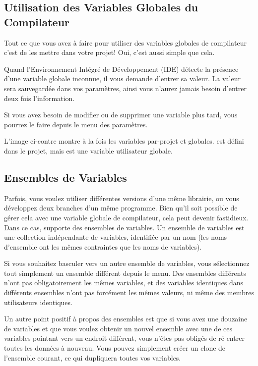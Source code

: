 \subsection{Utilisation des Variables Globales du Compilateur}

Tout ce que vous avez à faire pour utiliser des variables globales de compilateur c'est de les mettre dans votre projet! Oui, c'est aussi simple que cela.

Quand l'Environnement Intégré de Développement (IDE) détecte la présence d'une variable globale inconnue, il vous demande d'entrer sa valeur. La valeur sera sauvegardée dans vos paramètres, ainsi vous n'aurez jamais besoin d'entrer deux fois l'information.

Si vous avez besoin de modifier ou de supprimer une variable plus tard, vous pourrez le faire depuis le menu des paramètres.




L'image ci-contre montre à la fois les variables par-projet et globales.  est défini dans le projet, mais  est une variable utilisateur globale.

\subsection{Ensembles de Variables}

Parfois, vous voulez utiliser différentes versions d'une même librairie, ou vous développez deux branches d’un même programme. Bien qu'il soit possible de gérer cela avec une variable globale de compilateur, cela peut devenir fastidieux. Dans ce cas, \codeblocks supporte des ensembles de variables. Un ensemble de variables est une collection indépendante de variables, identifiée par un nom (les noms d'ensemble ont les mêmes contraintes que les noms de variables).

Si vous souhaitez basculer vers un autre ensemble de variables, vous sélectionnez tout simplement un ensemble différent depuis le menu. Des ensembles différents n'ont pas obligatoirement les mêmes variables, et des variables identiques dans différents ensembles n'ont pas forcément les mêmes valeurs, ni même des membres utilisateurs identiques.

Un autre point positif à propos des ensembles est que si vous avez une douzaine de variables et que vous voulez obtenir un nouvel ensemble avec une de ces variables pointant vers un endroit différent, vous n'êtes pas obligés de ré-entrer toutes les données à nouveau. Vous pouvez simplement créer un clone de l'ensemble courant, ce qui dupliquera toutes vos variables.


